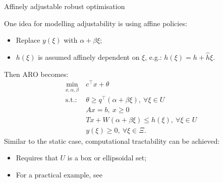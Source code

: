 \begin{frame}{Affinely adjustable robust optimisation {\small \cite{ben2004adjustable}}}

	One idea for modelling adjustability is using \alert{affine policies}:
	\vspace{-6pt}
	\begin{itemize}
		\item Replace $y(\xi)$ with $\alpha + \beta \xi$;
		\item $h(\xi)$ is assumed \alert{affinely dependent} on $\xi$, e.g.: $h(\xi)	 = h + \hat{h}\xi$.
	\end{itemize}
	
	\pause
	Then ARO becomes:
	\begin{equation*}
	\begin{aligned}
		\min_{x, \alpha, \beta}~  & c^\top x + \theta  \\
		\text{s.t.:~}  & \theta \ge q^\top (\alpha + \beta \xi), \ \forall \xi \in U \\
			   & Ax = b, \ x \ge 0 \\
			   & Tx + W(\alpha + \beta \xi) \le h(\xi), \ \forall \xi \in U \\
			   & y(\xi) \ge 0, \ \forall \xi \in \Xi.
	\end{aligned}
	\end{equation*}
	\pause
	Similar to the static case, computational \alert{tractability} can be achieved:
		\vspace{-6pt}
		\begin{itemize}
			\item Requires that $U$ is a box or ellipsoidal set;
			\item For a practical example, see {\small \cite{ben2005retailer}}	
		\end{itemize}
   
\end{frame}


